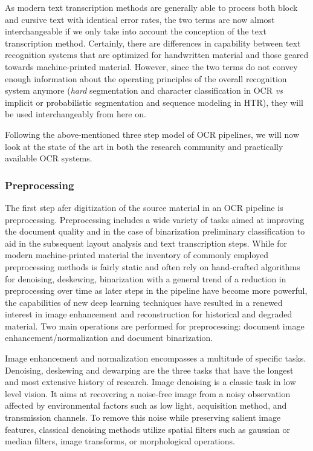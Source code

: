 As modern text transcription methods are generally able to process both block
and cursive text with identical error rates, the two terms are now almost
interchangeable if we only take into account the conception of the text
transcription method. Certainly, there are differences in capability between
text recognition systems that are optimized for handwritten material and those
geared towards machine-printed material. However, since the two terms do not
convey enough information about the operating principles of the overall
recognition system anymore (\emph{hard} segmentation and character
classification in OCR \emph{vs} implicit or probabilistic segmentation and
sequence modeling in HTR), they will be used interchangeably from here on.

Following the above-mentioned three step model of OCR pipelines, we will now
look at the state of the art in both the research community and practically
available OCR systems.

\subsubsection{Preprocessing}

The first step afer digitization of the source material in an OCR pipeline is
preprocessing. Preprocessing includes a wide variety of tasks aimed at
improving the document quality and in the case of binarization preliminary
classification to aid in the subsequent layout analysis and text transcription
steps. While for modern machine-printed material the inventory of commonly
employed preprocessing methods is fairly static and often rely on hand-crafted
algorithms for denoising, deskewing, binarization with a general trend of a
reduction in preprocessing over time as later steps in the pipeline have become
more powerful, the capabilities of new deep learning techniques have resulted
in a renewed interest in image enhancement and reconstruction for historical
and degraded material. Two main operations are performed for preprocessing:
document image enhancement/normalization and document binarization.

Image enhancement and normalization encompasses a multitude of specific tasks.
Denoising, deskewing and dewarping are the three tasks that have the longest
and most extensive history of research. Image denoising is a classic task in
low level vision. It aims at recovering a noise-free image from a noisy
observation affected by environmental factors such as low light, acquisition
method, and transmission channels. To remove this noise while preserving
salient image features, classical denoising methods utilize spatial filters
such as gaussian or median filters, image transforms, or morphological
operations. 

